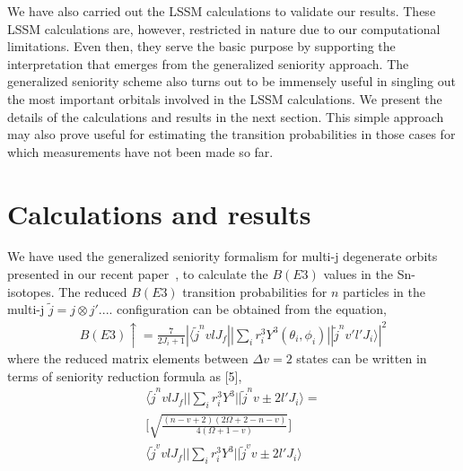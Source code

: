 \documentclass[twocolumn,showpacs,showkeys,preprintnumbers,amsmath,amssymb]{revtex4}
\begin{document}
We have also carried out the LSSM calculations to validate our results. These LSSM calculations are, however, restricted in nature due to our computational limitations. Even then, they serve the basic purpose by supporting the interpretation that emerges from the generalized seniority approach. The generalized seniority scheme also turns out to be immensely useful in singling out the most important orbitals involved in the LSSM calculations. We present the details of the calculations and results in the next section. This simple approach may also prove useful for estimating the transition probabilities in those cases for which measurements have not been made so far. 

\section{Calculations and results}

We have used the generalized seniority formalism for multi-j degenerate orbits presented in our recent paper~\cite{maheshwari1}, to calculate the $B(E3)$ values in the Sn-isotopes. The reduced $B(E3)$ transition probabilities for $n$ particles in the multi-j $\tilde{j}=j \otimes j' ....$ configuration can be obtained from the equation, 
%
\begin{eqnarray}
B(E3) \uparrow=\frac{7}{2J_i+1}|\langle \tilde{j}^n v l J_f || \sum_i r_i^3 Y^{3}(\theta_i,\phi_i) || \tilde{j}^n v' l' J_i \rangle |^2
\end{eqnarray}
% 
where the reduced matrix elements between $\Delta v = 2$ states can be written in terms of seniority reduction formula as [5],
%
\begin{eqnarray}
\langle \tilde{j}^n v l J_f ||\sum_i r_i^3 Y^{3}|| \tilde{j}^n v\pm 2 l' J_i \rangle  = \nonumber\\ \Bigg[ \sqrt{\frac{(n-v+2)(2\Omega+2-n-v)}{4(\Omega+1-v)}} \Bigg] \nonumber\\ \langle \tilde{j}^v v l J_f ||\sum_i r_i^3 Y^{3}|| \tilde{j}^v v\pm 2 l' J_i \rangle 
\end{eqnarray}
%
\end{document}
